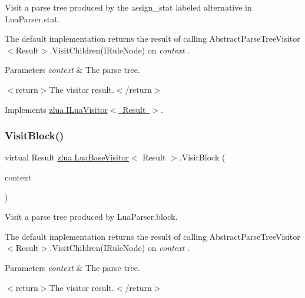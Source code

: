 Visit a parse tree produced by the {\ttfamily assign\+\_\+stat} labeled alternative in Lua\+Parser.\+stat. 

The default implementation returns the result of calling Abstract\+Parse\+Tree\+Visitor$<$\+Result$>$.\+Visit\+Children(\+I\+Rule\+Node) on {\itshape context} . 


\begin{DoxyParams}{Parameters}
{\em context} & The parse tree.\\
\hline
\end{DoxyParams}
$<$return$>$The visitor result.$<$/return$>$ 

Implements \mbox{\hyperlink{interfacezlua_1_1_i_lua_visitor_a079bc4442510a3a834234725ef2b9673}{zlua.\+I\+Lua\+Visitor$<$ Result $>$}}.

\mbox{\label{classzlua_1_1_lua_base_visitor_ad48d1aadd0185f15f13db086072bbe08}} 
\subsubsection{\texorpdfstring{Visit\+Block()}{VisitBlock()}}
{\footnotesize\ttfamily virtual Result \mbox{\hyperlink{classzlua_1_1_lua_base_visitor}{zlua.\+Lua\+Base\+Visitor}}$<$ Result $>$.Visit\+Block (\begin{DoxyParamCaption}\item[{\mbox{[}\+Not\+Null\mbox{]} \mbox{\hyperlink{classzlua_1_1_lua_parser_1_1_block_context}{Lua\+Parser.\+Block\+Context}}}]{context }\end{DoxyParamCaption})\hspace{0.3cm}{\ttfamily [virtual]}}



Visit a parse tree produced by Lua\+Parser.\+block. 

The default implementation returns the result of calling Abstract\+Parse\+Tree\+Visitor$<$\+Result$>$.\+Visit\+Children(\+I\+Rule\+Node) on {\itshape context} . 


\begin{DoxyParams}{Parameters}
{\em context} & The parse tree.\\
\hline
\end{DoxyParams}
$<$return$>$The visitor result.$<$/return$>$ 

